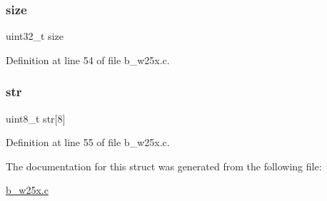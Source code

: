 \subsubsection{\texorpdfstring{size}{size}}
{\footnotesize\ttfamily uint32\+\_\+t size}



Definition at line 54 of file b\+\_\+w25x.\+c.

\mbox{\label{structb_w25_x___info__t_ac3d68b06876e51e9e7a74e389c73b09c}} 
\subsubsection{\texorpdfstring{str}{str}}
{\footnotesize\ttfamily uint8\+\_\+t str\mbox{[}8\mbox{]}}



Definition at line 55 of file b\+\_\+w25x.\+c.



The documentation for this struct was generated from the following file\+:\begin{DoxyCompactItemize}
\item 
\mbox{\hyperlink{b__w25x_8c}{b\+\_\+w25x.\+c}}\end{DoxyCompactItemize}

